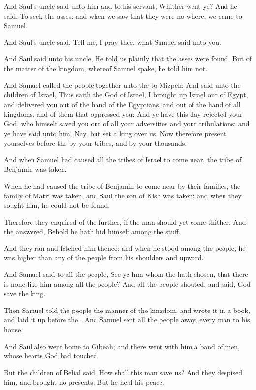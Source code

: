 \Verse And Saul's uncle said unto him and to his servant, Whither went ye?  And he said, To seek the asses: and when we saw that they were no where, we came to Samuel.

\Verse And Saul's uncle said, Tell me, I pray thee, what Samuel said unto you.

\Verse And Saul said unto his uncle, He told us plainly that the asses were found. But of the matter of the kingdom, whereof Samuel spake, he told him not.

\Verse And Samuel called the people together unto the \LORD to Mizpeh; \Verse And said unto the children of Israel, Thus saith the \LORD God of Israel, I brought up Israel out of Egypt, and delivered you out of the hand of the Egyptians, and out of the hand of all kingdoms, and of them that oppressed you: \Verse And ye have this day rejected your God, who himself saved you out of all your adversities and your tribulations; and ye have said unto him, Nay, but set a king over us.  Now therefore present yourselves before the \LORD by your tribes, and by your thousands.

\Verse And when Samuel had caused all the tribes of Israel to come near, the tribe of Benjamin was taken.

\Verse When he had caused the tribe of Benjamin to come near by their families, the family of Matri was taken, and Saul the son of Kish was taken: and when they sought him, he could not be found.

\Verse Therefore they enquired of the \LORD further, if the man should yet come thither. And the \LORD answered, Behold he hath hid himself among the stuff.

\Verse And they ran and fetched him thence: and when he stood among the people, he was higher than any of the people from his shoulders and upward.

\Verse And Samuel said to all the people, See ye him whom the \LORD hath chosen, that there is none like him among all the people? And all the people shouted, and said, God save the king.

\Verse Then Samuel told the people the manner of the kingdom, and wrote it in a book, and laid it up before the \LORD. And Samuel sent all the people away, every man to his house.

\Verse And Saul also went home to Gibeah; and there went with him a band of men, whose hearts God had touched.

\Verse But the children of Belial said, How shall this man save us? And they despised him, and brought no presents. But he held his peace.


